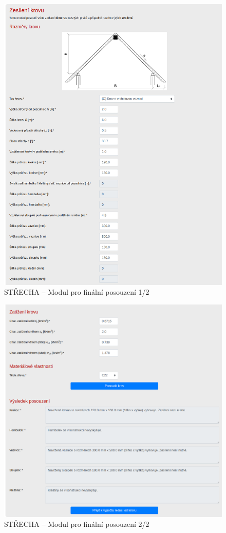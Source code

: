 \begin{figure}[H]
    \includegraphics{assets/figures/wbapp/strecha_old-0-0.png}
    \caption{STŘECHA -- Modul pro finální posouzení 1/2}
    \label{fig:roof_old_1}
\end{figure}

\begin{figure}[H]
    \includegraphics{assets/figures/wbapp/strecha_old-0-1.png}
    \caption{STŘECHA -- Modul pro finální posouzení 2/2}
    \label{fig:roof_old_2}
\end{figure}


